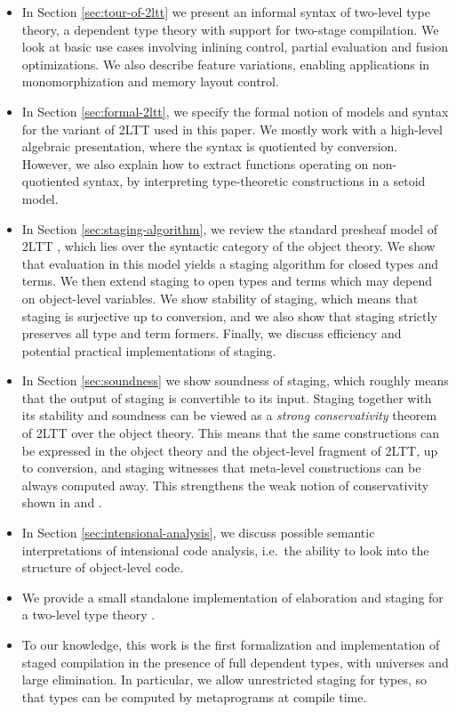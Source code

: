 \documentclass[acmsmall,screen]{acmart}
\theoremstyle{remark}
\begin{document}
\begin{itemize}
  \item In Section \ref{sec:tour-of-2ltt} we present an informal syntax of
    two-level type theory, a dependent type theory with support for two-stage
    compilation. We look at basic use cases involving inlining control, partial
    evaluation and fusion optimizations. We also describe feature variations,
    enabling applications in monomorphization and memory layout control.
  \item In Section \ref{sec:formal-2ltt}, we specify the formal notion of models
    and syntax for the variant of 2LTT used in this paper. We mostly work with a
    high-level algebraic presentation, where the syntax is quotiented by
    conversion. However, we also explain how to extract functions
    operating on non-quotiented syntax, by interpreting type-theoretic
    constructions in a setoid model.
  \item
    In Section \ref{sec:staging-algorithm}, we review the standard presheaf
    model of 2LTT \cite[Section~2.5.3]{twolevel}, which lies over the syntactic
    category of the object theory. We show that evaluation in this model yields
    a staging algorithm for closed types and terms. We then extend staging to
    open types and terms which may depend on object-level variables. We show
    stability of staging, which means that staging is surjective up to
    conversion, and we also show that staging strictly preserves all type and
    term formers. Finally, we discuss efficiency and potential practical implementations
    of staging.
  \item
    In Section \ref{sec:soundness} we show soundness of staging, which roughly
    means that the output of staging is convertible to its input. Staging
    together with its stability and soundness can be viewed as a \emph{strong
    conservativity} theorem of 2LTT over the object theory. This means that the
    same constructions can be expressed in the object theory and the
    object-level fragment of 2LTT, up to conversion, and staging witnesses that
    meta-level constructions can be always computed away. This strengthens the
    weak notion of conservativity shown in \cite{capriotti2017models} and
    \cite{twolevel}.
  \item
    In Section \ref{sec:intensional-analysis}, we discuss possible semantic
    interpretations of intensional code analysis, i.e.\ the ability to look into
    the structure of object-level code.
  \item We provide a small standalone implementation of elaboration and staging
    for a two-level type theory \cite{staged-demo}.
  \item To our knowledge, this work is the first formalization and implementation of
    staged compilation in the presence of full dependent types, with
    universes and large elimination. In particular, we allow unrestricted
    staging for types, so that types can be computed by metaprograms at compile
    time.
\end{itemize}
\end{document}
